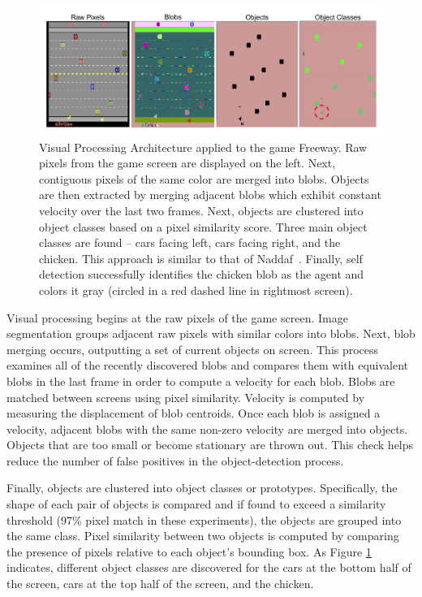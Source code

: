 \documentclass{sig-alternate}
\begin{document}
\begin{figure}[htp]
\begin{center}
\includegraphics[width=\textwidth]{figures/AtariArch}
\end{center}
\caption{Visual Processing Architecture applied to the game Freeway. Raw pixels from the game screen are displayed on the left. Next, contiguous pixels of the same color are merged into blobs. Objects are then extracted by merging adjacent blobs which exhibit constant velocity over the last two frames. Next, objects are clustered into object classes based on a pixel similarity score. Three main object classes are found -- cars facing left, cars facing right, and the chicken. This approach is similar to that of Naddaf~\cite{naddaf10}. Finally, self detection successfully identifies the chicken blob as the agent and colors it gray (circled in a red dashed line in rightmost screen).}
\label{fig:visproc}
\end{figure}

Visual processing begins at the raw pixels of the game screen. Image segmentation groups adjacent raw pixels with similar colors into blobs. Next, blob merging occurs, outputting a set of current objects on screen. This process examines all of the recently discovered blobs and compares them with equivalent blobs in the last frame in order to compute a velocity for each blob. Blobs are matched between screens using pixel similarity. Velocity is computed by measuring the displacement of blob centroids. Once each blob is assigned a velocity, adjacent blobs with the same non-zero velocity are merged into objects. Objects that are too small or become stationary are thrown out. This check helps reduce the number of false positives in the object-detection process.

Finally, objects are clustered into object classes or prototypes. Specifically, the shape of each pair of objects is compared and if found to exceed a similarity threshold (97\% pixel match in these experiments), the objects are grouped into the same class. Pixel similarity between two objects is computed by comparing the presence of pixels relative to each object's bounding box. As Figure \ref{fig:visproc} indicates, different object classes are discovered for the cars at the bottom half of the screen, cars at the top half of the screen, and the chicken. 
\end{document}
